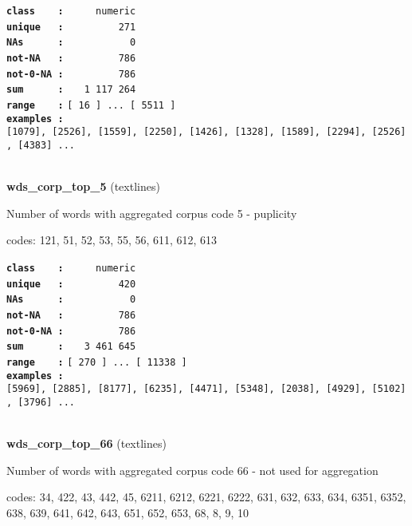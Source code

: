 \documentclass[]{article}
\begin{document}
\textbf{\texttt{class\ \ \ \ :}} \texttt{~~~~~numeric}\\
\textbf{\texttt{unique\ \ \ :}} \texttt{~~~~~~~~~271}\\
\textbf{\texttt{NAs\ \ \ \ \ \ :}} \texttt{~~~~~~~~~~~0}\\
\textbf{\texttt{not-NA\ \ \ :}} \texttt{~~~~~~~~~786}\\
\textbf{\texttt{not-0-NA\ :}} \texttt{~~~~~~~~~786}\\
\textbf{\texttt{sum\ \ \ \ \ \ :}} \texttt{~~~1~117~264}\\
\textbf{\texttt{range\ \ \ \ :}}
\texttt{{[}\ 16\ {]}\ ...\ {[}\ 5511\ {]}}\\
\textbf{\texttt{examples\ :}}
\texttt{{[}1079{]},\ {[}2526{]},\ {[}1559{]},\ {[}2250{]},\ {[}1426{]},\ {[}1328{]},\ {[}1589{]},\ {[}2294{]},\ {[}2526{]},\ {[}4383{]}\ ...}\\

~

\textbf{wds\_corp\_top\_5} (textlines)

Number of words with aggregated corpus code 5 - puplicity

codes: 121, 51, 52, 53, 55, 56, 611, 612, 613

\textbf{\texttt{class\ \ \ \ :}} \texttt{~~~~~numeric}\\
\textbf{\texttt{unique\ \ \ :}} \texttt{~~~~~~~~~420}\\
\textbf{\texttt{NAs\ \ \ \ \ \ :}} \texttt{~~~~~~~~~~~0}\\
\textbf{\texttt{not-NA\ \ \ :}} \texttt{~~~~~~~~~786}\\
\textbf{\texttt{not-0-NA\ :}} \texttt{~~~~~~~~~786}\\
\textbf{\texttt{sum\ \ \ \ \ \ :}} \texttt{~~~3~461~645}\\
\textbf{\texttt{range\ \ \ \ :}}
\texttt{{[}\ 270\ {]}\ ...\ {[}\ 11338\ {]}}\\
\textbf{\texttt{examples\ :}}
\texttt{{[}5969{]},\ {[}2885{]},\ {[}8177{]},\ {[}6235{]},\ {[}4471{]},\ {[}5348{]},\ {[}2038{]},\ {[}4929{]},\ {[}5102{]},\ {[}3796{]}\ ...}\\

~

\textbf{wds\_corp\_top\_66} (textlines)

Number of words with aggregated corpus code 66 - not used for
aggregation

codes: 34, 422, 43, 442, 45, 6211, 6212, 6221, 6222, 631, 632, 633, 634,
6351, 6352, 638, 639, 641, 642, 643, 651, 652, 653, 68, 8, 9, 10
\end{document}
